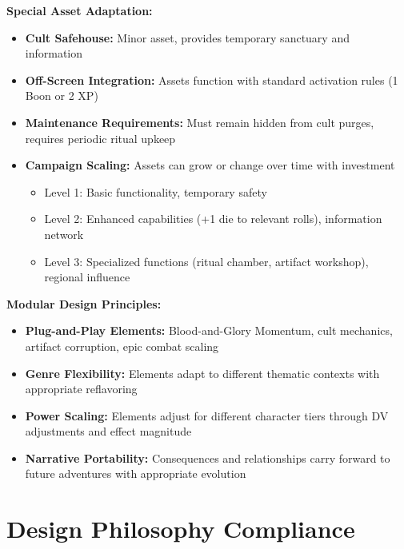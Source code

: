 \documentclass[11pt]{article}
\begin{document}
\begin{itemize}
\textbf{Special Asset Adaptation:}
\begin{itemize}
\item \textbf{Cult Safehouse:} Minor asset, provides temporary sanctuary and information
\item \textbf{Off-Screen Integration:} Assets function with standard activation rules (1 Boon or 2 XP)
\item \textbf{Maintenance Requirements:} Must remain hidden from cult purges, requires periodic ritual upkeep
\item \textbf{Campaign Scaling:} Assets can grow or change over time with investment
  \begin{itemize}
  \item Level 1: Basic functionality, temporary safety
  \item Level 2: Enhanced capabilities (+1 die to relevant rolls), information network
  \item Level 3: Specialized functions (ritual chamber, artifact workshop), regional influence
  \end{itemize}
\end{itemize}

\textbf{Modular Design Principles:}
\begin{itemize}
\item \textbf{Plug-and-Play Elements:} Blood-and-Glory Momentum, cult mechanics, artifact corruption, epic combat scaling
\item \textbf{Genre Flexibility:} Elements adapt to different thematic contexts with appropriate reflavoring
\item \textbf{Power Scaling:} Elements adjust for different character tiers through DV adjustments and effect magnitude
\item \textbf{Narrative Portability:} Consequences and relationships carry forward to future adventures with appropriate evolution
\end{itemize}

\section{Design Philosophy Compliance}


\end{itemize}
\end{document}
